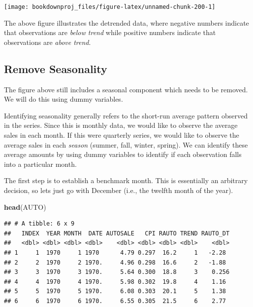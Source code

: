 \documentclass[
]{book}
\newenvironment{Shaded}{\begin{snugshade}}{\end{snugshade}}
\newcommand{\FunctionTok}[1]{\textcolor[rgb]{0.13,0.29,0.53}{\textbf{#1}}}
\newcommand{\NormalTok}[1]{#1}
\begin{document}
\begin{center}\texttt{[image: bookdownproj\_files/figure-latex/unnamed-chunk-200-1]} \end{center}

The above figure illustrates the detrended data, where negative numbers indicate that observations are \emph{below trend} while positive numbers indicate that observations are \emph{above trend}.

\subsection*{Remove Seasonality}\label{remove-seasonality}

The figure above still includes a seasonal component which needs to be removed. We will do this using dummy variables.

Identifying seasonality generally refers to the short-run average pattern observed in the series. Since this is monthly data, we would like to observe the average sales in each month. If this were quarterly series, we would like to observe the average sales in each \emph{season} (summer, fall, winter, spring). We can identify these average amounts by using dummy variables to identify if each observation falls into a particular month.

The first step is to establish a benchmark month. This is essentially an arbitrary decision, so lets just go with December (i.e., the twelfth month of the year).

\begin{Shaded}
\begin{Highlighting}[]
\FunctionTok{head}\NormalTok{(AUTO)}
\end{Highlighting}
\end{Shaded}

\begin{verbatim}
## # A tibble: 6 x 9
##   INDEX  YEAR MONTH  DATE AUTOSALE   CPI RAUTO TREND RAUTO_DT
##   <dbl> <dbl> <dbl> <dbl>    <dbl> <dbl> <dbl> <dbl>    <dbl>
## 1     1  1970     1 1970      4.79 0.297  16.2     1   -2.28 
## 2     2  1970     2 1970.     4.96 0.298  16.6     2   -1.88 
## 3     3  1970     3 1970.     5.64 0.300  18.8     3    0.256
## 4     4  1970     4 1970.     5.98 0.302  19.8     4    1.16 
## 5     5  1970     5 1970.     6.08 0.303  20.1     5    1.38 
## 6     6  1970     6 1970.     6.55 0.305  21.5     6    2.77
\end{verbatim}
\end{document}
